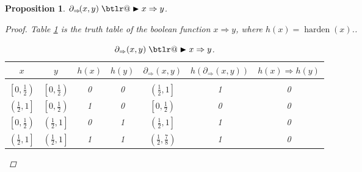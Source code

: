 \documentclass{article} %
\makeatletter
\newtheorem{prop}{Proposition}
\DeclareRobustCommand{\btright}{\mathrel{\mathpalette\btlr@\blacktriangleright}}
\newcommand{\btlr@}[2]{%
	\begingroup
	\sbox\z@{$\m@th#1\triangleright$}%
	\sbox\tw@{\resizebox{1.1\wd\z@}{1.1\ht\z@}{\raisebox{\depth}{$\m@th#1\mkern-1mu#2$}}}%
	\ht\tw@=\ht\z@ \dp\tw@=\dp\z@ \wd\tw@=\wd\z@
	\copy\tw@
	\endgroup
}
\makeatother
\begin{document}
\begin{prop}\label{prop:implies}
	$\partial_{\Rightarrow}\!(x,y) \btright x \Rightarrow y$.
\begin{proof}
	Table \ref{implies-table} is the truth table of the boolean function $x \Rightarrow y$, where $h(x) = \operatorname{harden}(x)$..
	\begin{table}[h!]
	\begin{center}
		\begin{tabular}{ccccccc}
			\multicolumn{1}{c}{$x$}  &\multicolumn{1}{c}{$y$}  &\multicolumn{1}{c}{$h(x)$}  &\multicolumn{1}{c}{$h(y)$} &\multicolumn{1}{c}{$\partial_{\Rightarrow}(x, y)$} &\multicolumn{1}{c}{$h(\partial_{\Rightarrow}(x, y))$}
			&\multicolumn{1}{c}{$h(x) \Rightarrow h(y)$}
			\\ \hline \\
			$\left[0, \frac{1}{2}\right)$ & $\left[0, \frac{1}{2}\right)$ & 0 & 0 & $\left(\frac{1}{2}, 1\right]$ & 1 & 0\\[0.1cm]
			$\left(\frac{1}{2}, 1\right]$ & $\left[0, \frac{1}{2}\right)$ &1 & 0 & $\left[0, \frac{1}{2}\right)$ & 0 & 0\\[0.1cm]
			$\left[0, \frac{1}{2}\right)$ & $\left(\frac{1}{2}, 1\right]$ &0 & 1 & $\left(\frac{1}{2},1\right]$ & 1 & 0\\[0.1cm]
			$\left(\frac{1}{2}, 1\right]$ & $\left(\frac{1}{2}, 1\right]$ &1 & 1 & $\left(\frac{1}{2}, \frac{7}{8}\right)$ & 1 & 0\\[0.1cm]
		\end{tabular}
	\end{center}
	\caption{$\partial_{\Rightarrow}(x,y) \btright x \Rightarrow y$.}\label{implies-table}
	\end{table}			
\end{proof}
\end{prop}
\end{document}
